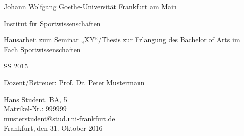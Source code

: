 \begin{titlepage}
	\centering
	Johann Wolfgang Goethe-Universität Frankfurt am Main
	
	Institut für Sportwissenschaften
	
	\vspace{12pt}
	
	Hausarbeit zum Seminar „XY“/Thesis zur Erlangung des Bachelor of Arts im Fach Sportwissenschaften
	
	SS 2015
	
	Dozent/Betreuer: Prof. Dr. Peter Mustermann
	
	\vfill
	
	\begin{flushleft}
		Hans Student, BA, 5 \\ 
		Matrikel-Nr.: 999999 \\ 
		musterstudent@stud.uni-frankfurt.de \\ 
		Frankfurt, den 31. Oktober 2016
	\end{flushleft}
\end{titlepage}
